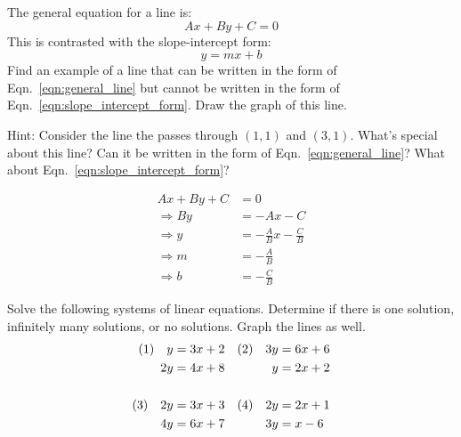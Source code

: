 \documentclass[crop=false,class=book,oneside]{standalone}                      %
\begin{document}
        \newpage
        \begin{problem}
            The general equation for a line is:
            \begin{equation}
                \label{eqn:general_line}%
                Ax+By+C=0
            \end{equation}
            This is contrasted with the slope-intercept form:
            \begin{equation}
                \label{eqn:slope_intercept_form}%
                y=mx+b
            \end{equation}
            Find an example of a line that can be written
            in the form of Eqn.~\ref{eqn:general_line} but
            cannot be written in the form of
            Eqn.~\ref{eqn:slope_intercept_form}. Draw the graph of
            this line.
            \par
            Hint: Consider the line the passes through
            $(1,1)$ and $(3,1)$. What's special about this line?
            Can it be written in the form of
            Eqn.~\ref{eqn:general_line}? What about
            Eqn.~\ref{eqn:slope_intercept_form}?
        \end{problem}
        \begin{solution}
            \begin{align}
                Ax+By+C&=0\\
                \Rightarrow{B}y&=\minus{A}x-C\\
                \Rightarrow{y}&=\minus\frac{A}{B}x-\frac{C}{B}\\
                \Rightarrow{m}&=\minus\frac{A}{B}\\
                \Rightarrow{b}&=\minus\frac{C}{B}
            \end{align}
        \end{solution}
        \newpage
        \begin{problem}
            Solve the following systems of linear equations.
            Determine if there is one solution, infinitely many
            solutions, or no solutions. Graph the lines as well.
            \begin{align*}
                (1)\quad{y}&=3x+2&(2)\quad{3}y&=6x+6\\
                2y&=4x+8&y&=2x+2\\
                \hfill\\
                (3)\quad{2}y&=3x+3&(4)\quad{2}y&=2x+1\\
                4y&=6x+7&3y&=x-6
            \end{align*}
        \end{problem}
\end{document}
